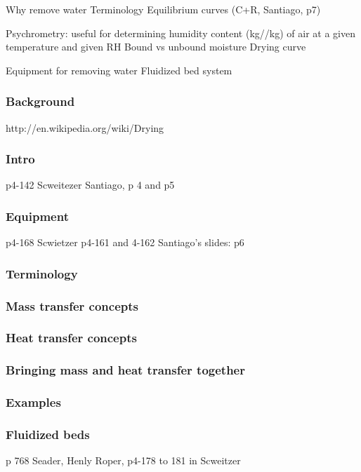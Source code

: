 
Why remove water
Terminology
Equilibrium curves (C+R, Santiago, p7)

Psychrometry: useful for determining humidity content (kg//kg) of air at a given temperature and given RH
Bound vs unbound moisture
Drying curve


Equipment for removing water
Fluidized bed system



\begin{frame}\frametitle{Background}
	http://en.wikipedia.org/wiki/Drying
\end{frame}

\begin{frame}\frametitle{Intro}
	p4-142 Scweitezer
	Santiago, p 4 and p5
\end{frame}

\begin{frame}\frametitle{Equipment}
	p4-168 Scwietzer
	p4-161 and 4-162
	Santiago's slides: p6
\end{frame}

\begin{frame}\frametitle{Terminology}
	
\end{frame}

\begin{frame}\frametitle{Mass transfer concepts}
	
\end{frame}

\begin{frame}\frametitle{Heat transfer concepts}
	
\end{frame}

\begin{frame}\frametitle{Bringing mass and heat transfer together}
	
\end{frame}

\begin{frame}\frametitle{Examples}
	
\end{frame}

\begin{frame}\frametitle{Fluidized beds}
	p 768 Seader, Henly Roper,
	p4-178 to 181 in Scweitzer
\end{frame}


